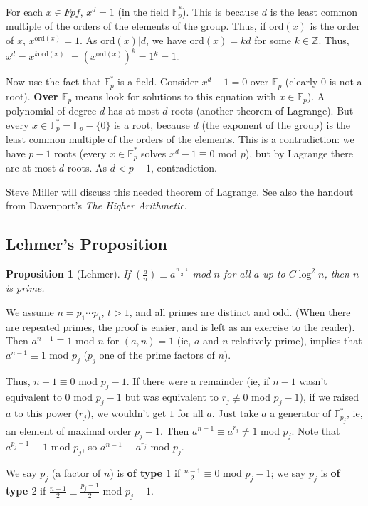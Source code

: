 \documentclass[12pt,letterpaper]{report}
\newcommand{\Z}{\ensuremath{\mathbb{Z}}}
\newcommand{\F}{\mathbb{F}}
\newcommand{\Fp}{ \F_p }
\newcommand{\Fpf}{ \Fp^{*} }
\newcommand\lag[2]{\ensuremath{\left(\frac{#1}{#2}\right)}}
\newtheorem{prop}[thm]{Proposition}
\begin{document}
For each $x \in Fpf$, $x^d = 1$ (in the field $\Fpf$). This is
because $d$ is the least common multiple of the orders of the
elements of the group. Thus, if $\mbox{ord}(x)$ is the order of
$x$, $x^{\mbox{ord}(x)} = 1$. As $\mbox{ord}(x)|d$, we have
$\mbox{ord}(x) = kd$ for some $k \in \Z$. Thus, $x^d = x^{k
\mbox{ord}(x)}$ $= (x^{\mbox{ord}(x)})^k = 1^k = 1$.

Now use the fact that $\Fpf$ is a field. Consider $x^d - 1 = 0$
over $\Fp$ (clearly $0$ is not a root). \textbf{Over $\Fp$} means
look for solutions to this equation with $x \in \Fp$). A
polynomial of degree $d$ has at most $d$ roots (another theorem of
Lagrange). But every $x \in \Fpf = \Fp - \{0\}$ is a root, because
$d$ (the exponent of the group) is the least common multiple of
the orders of the elements. This is a contradiction: we have $p-1$
roots (every $x \in \Fpf$ solves $x^d - 1 \equiv 0$ mod $p$), but
by Lagrange there are at most $d$ roots. As $d < p-1$,
contradiction.

Steve Miller will discuss this needed theorem of Lagrange. See
also the handout from Davenport's \emph{The Higher Arithmetic}.

\subsection{Lehmer's Proposition}

\begin{prop}[Lehmer] If $\lag{a}{n} \equiv a^{\frac{n-1}{2}}$ mod
$n$ for all $a$ up to $C \log^2 n$, then $n$ is prime.
\end{prop}

We assume $n = p_1 \cdots p_t$, $t > 1$, and all primes are
distinct and odd. (When there are repeated primes, the proof is
easier, and is left as an exercise to the reader). Then $a^{n-1}
\equiv 1$ mod $n$ for $(a,n) = 1$ (ie, $a$ and $n$ relatively
prime), implies that $a^{n-1} \equiv 1$ mod $p_j$ ($p_j$ one of
the prime factors of $n$).

Thus, $n-1 \equiv 0$ mod $p_j - 1$. If there were a remainder (ie,
if $n-1$ wasn't equivalent to $0$ mod $p_j - 1$ but was equivalent
to $r_j \not\equiv 0$ mod $p_j - 1$), if we raised $a$ to this
power ($r_j$), we wouldn't get $1$ for all $a$. Just take $a$ a
generator of $\F_{p_j}^{*}$, ie, an element of maximal order $p_j
- 1$. Then $a^{n-1} \equiv a^{r_j} \neq 1$ mod $p_j$. Note that
$a^{p_j - 1} \equiv 1$ mod $p_j$, so $a^{n-1} \equiv a^{r_j}$ mod
$p_j$.

We say $p_j$ (a factor of $n$) is \textbf{of type $1$} if
$\frac{n-1}{2} \equiv 0$ mod $p_j-1$; we say $p_j$ is \textbf{of
type $2$} if $\frac{n-1}{2} \equiv \frac{p_j-1}{2}$ mod $p_j-1$.
\end{document}
